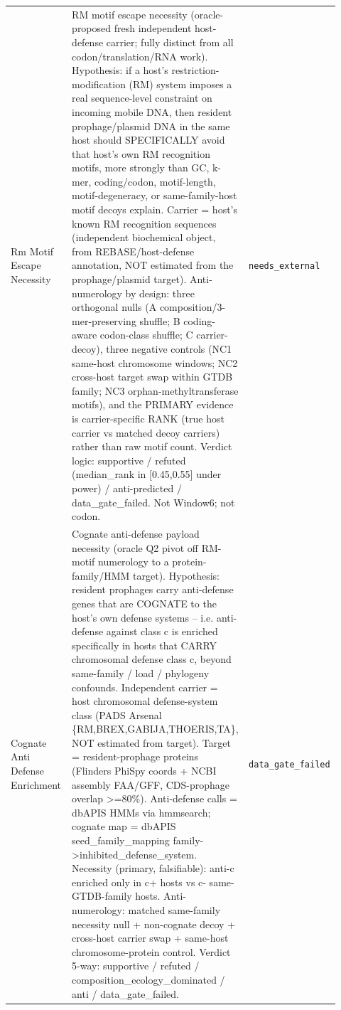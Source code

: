 \begin{longtable}{>{\raggedright\arraybackslash}p{0.22\linewidth}>{\raggedright\arraybackslash}p{0.55\linewidth}>{\raggedright\arraybackslash}p{0.15\linewidth}}
Rm Motif Escape Necessity & RM motif escape necessity (oracle-proposed fresh independent host-defense carrier; fully distinct from all codon/translation/RNA work). Hypothesis: if a host's restriction-modification (RM) system imposes a real sequence-level constraint on incoming mobile DNA, then resident prophage/plasmid DNA in the same host should SPECIFICALLY avoid that host's own RM recognition motifs, more strongly than GC, k-mer, coding/codon, motif-length, motif-degeneracy, or same-family-host motif decoys explain. Carrier = host's known RM recognition sequences (independent biochemical object, from REBASE/host-defense annotation, NOT estimated from the prophage/plasmid target). Anti-numerology by design: three orthogonal nulls (A composition/3-mer-preserving shuffle; B coding-aware codon-class shuffle; C carrier-decoy), three negative controls (NC1 same-host chromosome windows; NC2 cross-host target swap within GTDB family; NC3 orphan-methyltransferase motifs), and the PRIMARY evidence is carrier-specific RANK (true host carrier vs matched decoy carriers) rather than raw motif count. Verdict logic: supportive / refuted (median\_rank in [0.45,0.55] under power) / anti-predicted / data\_gate\_failed. Not Window6; not codon. & \texttt{needs\_external} \\
Cognate Anti Defense Enrichment & Cognate anti-defense payload necessity (oracle Q2 pivot off RM-motif numerology to a protein-family/HMM target). Hypothesis: resident prophages carry anti-defense genes that are COGNATE to the host's own defense systems -- i.e. anti-defense against class c is enriched specifically in hosts that CARRY chromosomal defense class c, beyond same-family / load / phylogeny confounds. Independent carrier = host chromosomal defense-system class (PADS Arsenal \{RM,BREX,GABIJA,THOERIS,TA\}, NOT estimated from target). Target = resident-prophage proteins (Flinders PhiSpy coords + NCBI assembly FAA/GFF, CDS-prophage overlap >=80\%). Anti-defense calls = dbAPIS HMMs via hmmsearch; cognate map = dbAPIS seed\_family\_mapping family->inhibited\_defense\_system. Necessity (primary, falsifiable): anti-c enriched only in c+ hosts vs c- same-GTDB-family hosts. Anti-numerology: matched same-family necessity null + non-cognate decoy + cross-host carrier swap + same-host chromosome-protein control. Verdict 5-way: supportive / refuted / composition\_ecology\_dominated / anti / data\_gate\_failed. & \texttt{data\_gate\_failed} \\

\end{longtable}
